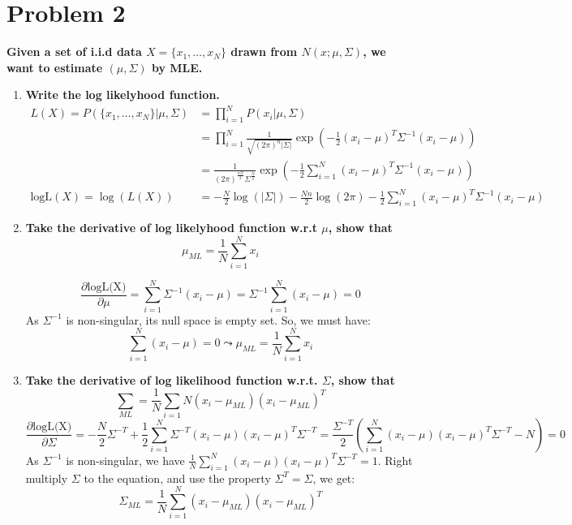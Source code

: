 \documentclass[paper=a4, fontsize=11pt]{scrartcl} %
\numberwithin{equation}{section} %
\numberwithin{figure}{section} %
\numberwithin{table}{section} %
\begin{document}
\section{Problem 2}
\textbf{Given a set of i.i.d data $X = \{x_1, \dots, x_N\}$ drawn from $N(x; \mu, \Sigma)$, we want to estimate $(\mu, \Sigma)$ by MLE.}
\begin{enumerate}[a]
\item \textbf{Write the log likelyhood function.}
  \[
  \begin{split}
    L(X) = P(\{x_1, \dots, x_N\} | \mu, \Sigma) & = \prod_{i=1}^{N} P(x_i | \mu, \Sigma) \\
    & = \prod_{i=1}^{N} \frac{1}{\sqrt{{(2\pi)}^n|\Sigma|}} \exp(-\frac{1}{2} {(x_i - \mu)}^T \Sigma^{-1} (x_i - \mu))\\
    & = \frac{1}{{(2\pi)}^{\frac{nN}{2}} {\Sigma}^{\frac{N}{2}}} \exp(-\frac{1}{2} \sum_{i=1}^N {(x_i - \mu)}^T \Sigma^{-1} (x_i - \mu)) \\
    \mbox{logL}(X) = \log(L(X)) & = - \frac{N}{2} \log(|\Sigma|) - \frac{Nn}{2} \log(2\pi) - \frac{1}{2} \sum_{i=1}^N {(x_i - \mu)}^T \Sigma^{-1} (x_i - \mu)
  \end{split}
  \]
\item \textbf{Take the derivative of log likelyhood function w.r.t $\mu$, show that}
  \[
  \mu_{ML} = \frac{1}{N} \displaystyle \sum_{i=1}^{N} x_i
  \]

  \[
  \frac{\partial \mbox{logL(X)}}{\partial \mu} = \sum_{i=1}^N \Sigma^{-1} (x_i - \mu) = \Sigma^{-1} \sum_{i=1}^N (x_i - \mu) = 0  \]
  As $\Sigma^{-1}$ is non-singular, its null space is empty set. So, we must have:
  \[
  \sum_{i=1}^N (x_i - \mu) = 0 \leadsto \mu_{ML} = \frac{1}{N} \sum_{i=1}^N x_i
  \]

\item \textbf{Take the derivative of log likelihood function w.r.t. $\Sigma$, show that}
  \[
  \sum _{ML} = \frac{1}{N} \displaystyle\sum_{i=1}{N} (x_i - \mu_{ML})(x_i - \mu_{ML})^T
  \]
  \[
  \frac{\partial \mbox{logL(X)}}{\partial \Sigma} = -\frac{N}{2} \Sigma^{-T} + \frac{1}{2} \sum_{i=1}^N \Sigma^{-T} (x_i - \mu)(x_i - \mu)^T \Sigma^{-T} = \frac{\Sigma^{-T}}{2} (\sum_{i=1}^N (x_i - \mu){(x_i - \mu)}^T \Sigma^{-T} - N) = 0
  \]
  As $\Sigma^{-1}$ is non-singular, we have $\frac{1}{N} \sum_{i=1}^N (x_i - \mu){(x_i - \mu)}^T \Sigma^{-T} = 1$.
  Right multiply $\Sigma$ to the equation, and use the property $\Sigma^T = \Sigma$, we get:
  \[
  \Sigma_{ML} = \frac{1}{N} \sum_{i=1}^N (x_i - \mu_{ML}){(x_i - \mu_{ML})}^T
  \]


\end{enumerate}
\end{document}

